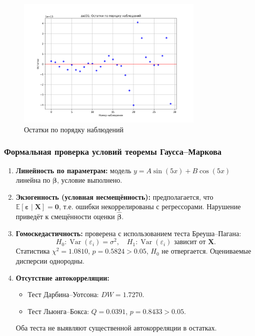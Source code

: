 \begin{figure}[H]
\centering
\includegraphics[width=0.8\textwidth]{fig/zad31_residuals_order.png}
\caption{Остатки по порядку наблюдений}
\label{fig:zad31_residuals_order}
\end{figure}

\subsubsection{Формальная проверка условий теоремы Гаусса–Маркова}

\begin{enumerate}
    \item \textbf{Линейность по параметрам:} модель $y = A \sin(5x) + B \cos(5x)$ линейна по $\boldsymbol{\beta}$, условие выполнено.

    \item \textbf{Экзогенность (условная несмещённость):} предполагается, что $\mathbb{E}[\boldsymbol{\varepsilon} \mid \mathbf{X}] = \mathbf{0}$, т.е. ошибки некоррелированы с регрессорами. Нарушение приведёт к смещённости оценки $\hat{\boldsymbol{\beta}}$.

    \item \textbf{Гомоскедастичность:} проверена с использованием теста Бреуша–Пагана:
    \[
    H_0: \operatorname{Var}(\varepsilon_i) = \sigma^2, \quad H_1: \operatorname{Var}(\varepsilon_i) \text{ зависит от } \mathbf{X}.
    \]
    Статистика $\chi^2 = 1.0810$, $p = 0.5824 > 0.05$, $H_0$ не отвергается. Оцениваемые дисперсии однородны.

    \item \textbf{Отсутствие автокорреляции:} 
    \begin{itemize}
        \item Тест Дарбина–Уотсона: $DW = 1.7270$.
        \item Тест Льюнга–Бокса: $Q = 0.0391$, $p = 0.8433 > 0.05$.
    \end{itemize}
    Оба теста не выявляют существенной автокорреляции в остатках.
\end{enumerate}

